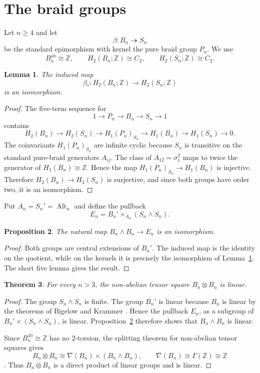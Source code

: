 \documentclass[11pt]{amsart}
\newtheorem{theorem}{Theorem}[section]
\newtheorem{lemma}[theorem]{Lemma}
\newtheorem{proposition}[theorem]{Proposition}
\theoremstyle{definition}
\newcommand{\Z}{\mathbb Z}
\begin{document}
\section{The braid groups}
Let $n\geq4$ and let
\[
 \beta:B_n\twoheadrightarrow S_n
\]
be the standard epimorphism with kernel the pure braid group $P_n$.  We use
\[
 B_n^{\mathrm{ab}}\cong\Z,\qquad H_2(B_n;\Z)\cong C_2,
 \qquad H_2(S_n;\Z)\cong C_2.
\]

\begin{lemma}\label{lem:h2}
The induced map
\[
 \beta_*:H_2(B_n;\Z)\longrightarrow H_2(S_n;\Z)
\]
is an isomorphism.
\end{lemma}
\begin{proof}
The five-term sequence for
\[
 1\to P_n\to B_n\to S_n\to1
\]
contains
\[
 H_2(B_n)\to H_2(S_n)\to H_1(P_n)_{S_n}\to H_1(B_n)\to H_1(S_n)\to0.
\]
The coinvariants $H_1(P_n)_{S_n}$ are infinite cyclic because $S_n$ is transitive on the standard pure-braid generators $A_{ij}$.  The class of $A_{12}=\sigma_1^2$ maps to twice the generator of $H_1(B_n)\cong\Z$.  Hence the map $H_1(P_n)_{S_n}\to H_1(B_n)$ is injective.  Therefore $H_2(B_n)\to H_2(S_n)$ is surjective, and since both groups have order two, it is an isomorphism.
\end{proof}

Put $A_n=S_n'=\operatorname{Alt}_n$ and define the pullback
\[
 E_n=B_n'\times_{A_n}(S_n\wedge S_n).
\]

\begin{proposition}\label{prop:exterior}
The natural map $B_n\wedge B_n\to E_n$ is an isomorphism.
\end{proposition}
\begin{proof}
Both groups are central extensions of $B_n'$.  The induced map is the identity on the quotient, while on the kernels it is precisely the isomorphism of Lemma~\ref{lem:h2}.  The short five lemma gives the result.
\end{proof}

\begin{theorem}\label{thm:braid}
For every $n>3$, the non-abelian tensor square $B_n\otimes B_n$ is linear.
\end{theorem}
\begin{proof}
The group $S_n\wedge S_n$ is finite.  The group $B_n'$ is linear because $B_n$ is linear by the theorems of Bigelow and Krammer \cite{bigelow,krammer}.  Hence the pullback $E_n$, as a subgroup of $B_n'\times(S_n\wedge S_n)$, is linear.  Proposition~\ref{prop:exterior} therefore shows that $B_n\wedge B_n$ is linear.

Since $B_n^{\mathrm{ab}}\cong\Z$ has no $2$-torsion, the splitting theorem for non-abelian tensor squares gives
\[
 B_n\otimes B_n\cong \nabla(B_n)\times(B_n\wedge B_n),
 \qquad \nabla(B_n)\cong\Gamma(\Z)\cong\Z
\]
\cite{bfm}.  Thus $B_n\otimes B_n$ is a direct product of linear groups and is linear.
\end{proof}
\end{document}
